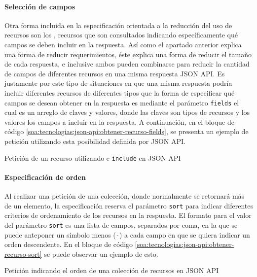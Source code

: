 \paragraph{Selección de campos}

Otra forma incluida en la especificación orientada a la reducción del uso de recursos son los , recursos que son consultados indicando específicamente qué campos se deben incluir en la respuesta. Así como el apartado anterior explica una forma de reducir requerimientos, éste explica una forma de reducir el tamaño de cada respuesta, e inclusive ambos pueden combinarse para reducir la cantidad de campos de diferentes recursos en una misma respuesta JSON API. Es justamente por este tipo de situaciones en que una misma respuesta podría incluir diferentes recursos de diferentes tipos que la forma de especificar qué campos se desean obtener en la respuesta es mediante el parámetro \texttt{fields} el cual es un arreglo de claves y valores, donde las claves son tipos de recursos y los valores los campos a incluir en la respuesta. A continuación, en el bloque de código \autoref{soa:tecnologias:json-api:obtener-recurso-fields}, se presenta un ejemplo de petición utilizando esta posibilidad definida por JSON API.

\begin{listing}
  \caption{Petición de un recurso utilizando  e \texttt{include} en JSON API}
  \label{soa:tecnologias:json-api:obtener-recurso-fields}
\end{listing}

\paragraph{Especificación de orden}

Al realizar una petición de una colección, donde normalmente se retornará más de un elemento, la especificación reserva el parámetro \texttt{sort} para indicar diferentes criterios de ordenamiento de los recursos en la respuesta. El formato para el valor del parámetro \texttt{sort} es una lista de campos, separados por coma, en la que se puede anteponer un símbolo menos (\texttt{-}) a cada campo en que se quiera indicar un orden descendente. En el bloque de código \autoref{soa:tecnologias:json-api:obtener-recurso-sort} se puede observar un ejemplo de esto.

\begin{listing}
  \caption{Petición indicando el orden de una colección de recursos en JSON API}
  \label{soa:tecnologias:json-api:obtener-recurso-sort}
\end{listing}

